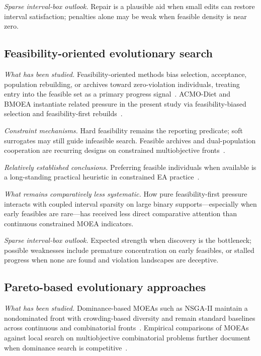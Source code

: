 \documentclass[lettersize,journal]{IEEEtran}
\begin{document}
\emph{Sparse interval-box outlook.}
Repair is a plausible aid when small edits can restore interval satisfaction; penalties alone may be weak when feasible density is near zero.

\subsection{Feasibility-oriented evolutionary search}
\emph{What has been studied.}
Feasibility-oriented methods bias selection, acceptance, population rebuilding, or archives toward zero-violation individuals, treating entry into the feasible set as a primary progress signal~\cite{yu2024adualpopulationc9fb6,kan2017aconstrainedmult6073,li2019ctaea}.
ACMO-Diet and BMOEA instantiate related pressure in the present study via feasibility-biased selection and feasibility-first rebuilds~\cite{zhao2025acmodiet}.

\emph{Constraint mechanisms.}
Hard feasibility remains the reporting predicate; soft surrogates may still guide infeasible search.
Feasible archives and dual-population cooperation are recurring designs on constrained multiobjective fronts~\cite{yu2024adualpopulationc9fb6,li2022aconstrainedmultef18}.

\emph{Relatively established conclusions.}
Preferring feasible individuals when available is a long-standing practical heuristic in constrained EA practice~\cite{kan2017aconstrainedmult6073,yu2024adualpopulationc9fb6}.

\emph{What remains comparatively less systematic.}
How pure feasibility-first pressure interacts with coupled interval sparsity on large binary supports---especially when early feasibles are rare---has received less direct comparative attention than continuous constrained MOEA indicators.

\emph{Sparse interval-box outlook.}
Expected strength when discovery is the bottleneck; possible weaknesses include premature concentration on early feasibles, or stalled progress when none are found and violation landscapes are deceptive.

\subsection{Pareto-based evolutionary approaches}
\emph{What has been studied.}
Dominance-based MOEAs such as NSGA-II maintain a nondominated front with crowding-based diversity and remain standard baselines across continuous and combinatorial fronts~\cite{deb2002,doerr2023afirstruntimeana3d85}.
Empirical comparisons of MOEAs against local search on multiobjective combinatorial problems further document when dominance search is competitive~\cite{li2024empiricalcompari3898}.
\end{document}

